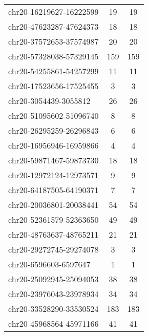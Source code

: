 \begin{longtable}{lSS}
	chr20-16219627-16222599 & 19     & 19                                        \\
	chr20-47623287-47624373 & 18     & 18                                        \\
	chr20-37572653-37574987 & 20     & 20                                        \\
	chr20-57328038-57329145 & 159    & 159                                       \\
	chr20-54255861-54257299 & 11     & 11                                        \\
	chr20-17523656-17525455 & 3      & 3                                         \\
	chr20-3054439-3055812   & 26     & 26                                        \\
	chr20-51095602-51096740 & 8      & 8                                         \\
	chr20-26295259-26296843 & 6      & 6                                         \\
	chr20-16956946-16959866 & 4      & 4                                         \\
	chr20-59871467-59873730 & 18     & 18                                        \\
	chr20-12972124-12973571 & 9      & 9                                         \\
	chr20-64187505-64190371 & 7      & 7                                         \\
	chr20-20036801-20038441 & 54     & 54                                        \\
	chr20-52361579-52363650 & 49     & 49                                        \\
	chr20-48763637-48765211 & 21     & 21                                        \\
	chr20-29272745-29274078 & 3      & 3                                         \\
	chr20-6596603-6597647   & 1      & 1                                         \\
	chr20-25092945-25094053 & 38     & 38                                        \\
	chr20-23976043-23978934 & 34     & 34                                        \\
	chr20-33528290-33530524 & 183    & 183                                       \\
	chr20-45968564-45971166 & 41     & 41                                        \\

\end{longtable}
